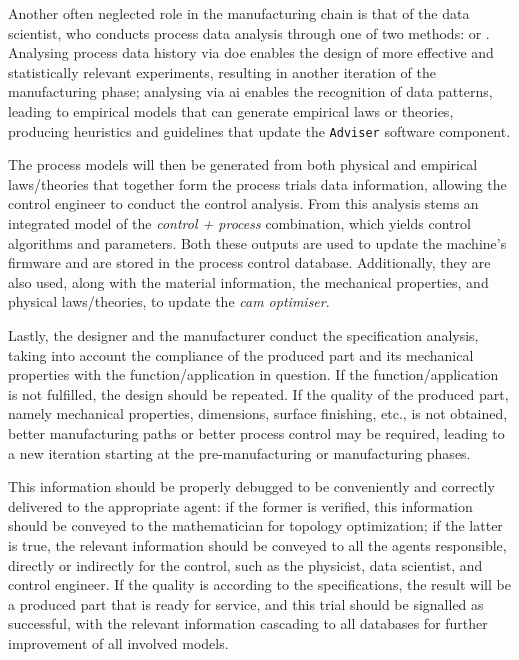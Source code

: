 Another often neglected role in the manufacturing chain is that of the data
scientist, who conducts process data analysis through one of two methods:
 or . Analysing process data history via \gls{doe} enables the design of more effective and statistically relevant experiments, resulting in another iteration of the manufacturing phase; analysing via \gls{ai} enables the recognition of data patterns, leading to empirical models that can generate empirical laws or theories, producing heuristics and guidelines that update the \texttt{Adviser} software component.

The process models will then be generated from both physical and empirical
laws/theories that together form the process trials data information, allowing the control engineer to conduct the control analysis. From this analysis
stems an integrated model of the \emph{control + process} combination,
which yields control algorithms and parameters. Both these outputs are used
to update the machine's firmware and are stored in the process control
database. Additionally, they are also used, along with the material
information, the mechanical properties, and physical laws/theories, to update
the \emph{\gls{cam} optimiser}.

Lastly, the designer and the manufacturer conduct the specification analysis, taking into account the compliance of the produced part and its mechanical properties with the function/application in question. If the function/application is not fulfilled, the design should be repeated. If the quality of the produced part, namely mechanical properties, dimensions, surface finishing, etc., is not obtained, better manufacturing paths or better process control may be required, leading to a new iteration starting at the pre-manufacturing or manufacturing phases.

This information should be properly debugged to be conveniently and correctly
delivered to the appropriate agent: if the former is verified, this
information should be conveyed to the mathematician for topology
optimization; if the latter is true, the relevant information should be
conveyed to all the agents responsible, directly or indirectly for the
control, such as the physicist, data scientist, and control engineer. If the
quality is according to the specifications, the result will be a produced
part that is ready for service, and this trial should be signalled as
successful, with the relevant information cascading to all databases for
further improvement of all involved models.

